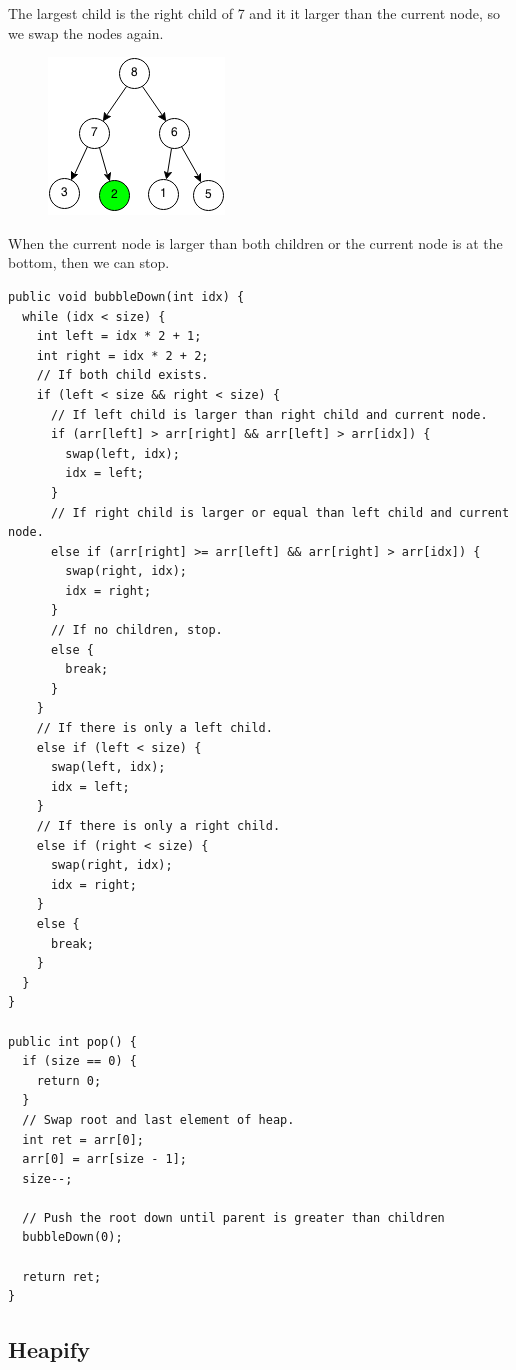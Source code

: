 \documentclass[11pt,oneside]{book}
\makeatletter
\def\maxwidth#1{\ifdim\Gin@nat@width>#1 #1\else\Gin@nat@width\fi}
\makeatother
\begin{document}
The largest child is the right child of 7 and it it larger than the current node, so we swap the nodes again.

\vspace{5px}\begin{figure}[H]\centering
        \includegraphics[width=0.66\maxwidth{\textwidth}]{maxheappop3.png}
        \end{figure}

When the current node is larger than both children or the current node is at the bottom, then we can stop.

\begin{lstlisting}
public void bubbleDown(int idx) {
  while (idx < size) {
    int left = idx * 2 + 1;
    int right = idx * 2 + 2;
    // If both child exists.
    if (left < size && right < size) {
      // If left child is larger than right child and current node.
      if (arr[left] > arr[right] && arr[left] > arr[idx]) {
        swap(left, idx);
        idx = left;
      }
      // If right child is larger or equal than left child and current node.
      else if (arr[right] >= arr[left] && arr[right] > arr[idx]) {
        swap(right, idx);
        idx = right;
      }
      // If no children, stop.
      else {
        break;
      }
    }
    // If there is only a left child.
    else if (left < size) {
      swap(left, idx);
      idx = left;
    }
    // If there is only a right child.
    else if (right < size) {
      swap(right, idx);
      idx = right;
    }
    else {
      break;
    }
  }
}

public int pop() {
  if (size == 0) {
    return 0;
  }
  // Swap root and last element of heap.
  int ret = arr[0];
  arr[0] = arr[size - 1];
  size--;

  // Push the root down until parent is greater than children
  bubbleDown(0);

  return ret;
}
\end{lstlisting}

\subsection{Heapify}
\end{document}
